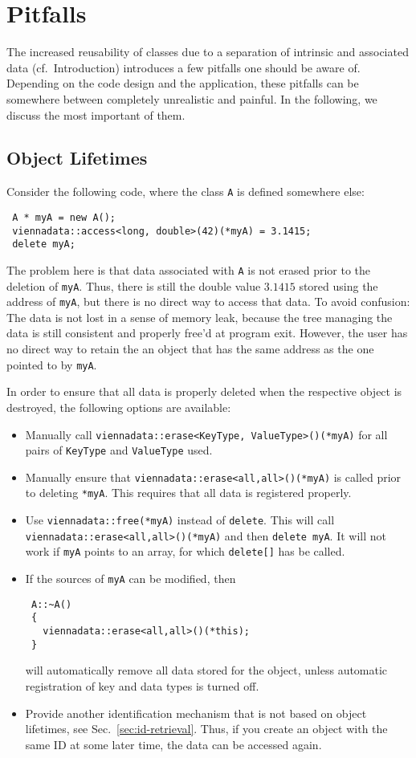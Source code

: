 \chapter{Pitfalls} \label{chap:pitfalls}
The increased reusability of classes due to a separation of intrinsic and associated data (cf.~Introduction)
introduces a few pitfalls one should be aware of. Depending on the code design and the application,
these pitfalls can be somewhere between completely unrealistic and painful. In the following, we discuss the most important of them.

\section{Object Lifetimes}
Consider the following code, where the class \lstinline|A| is defined somewhere else:
\begin{lstlisting}
 A * myA = new A();
 viennadata::access<long, double>(42)(*myA) = 3.1415;
 delete myA;
\end{lstlisting}
The problem here is that data associated with \lstinline|A| is not erased prior to the deletion of \lstinline|myA|.
Thus, there is still the double value $3.1415$ stored using the address of \lstinline|myA|, but there is no direct way to access that data.
To avoid confusion: The data is not lost in a sense of memory leak, because the tree managing the data is still consistent and properly free'd at program exit.
However, the user has no direct way to retain the an object that has the same address as the one pointed to by \lstinline|myA|.

In order to ensure that all data is properly deleted when the respective object is destroyed, the following options are available:
\begin{itemize}
 \item Manually call \lstinline|viennadata::erase<KeyType, ValueType>()(*myA)| for all pairs of \lstinline|KeyType| and \lstinline|ValueType| used.
 \item Manually ensure that \lstinline|viennadata::erase<all,all>()(*myA)| is called prior to deleting \lstinline|*myA|. This requires that all data is registered properly.
 \item Use \lstinline|viennadata::free(*myA)| instead of \lstinline|delete|. This will call \lstinline|viennadata::erase<all,all>()(*myA)| and then \lstinline|delete myA|. 
 It will not work if \lstinline|myA| points to an array, for which \lstinline|delete[]| has be called.
 \item If the sources of \lstinline|myA| can be modified, then
\begin{lstlisting}
 A::~A()
 {
   viennadata::erase<all,all>()(*this);
 }
\end{lstlisting}
will automatically remove all data stored for the object, unless automatic registration of key and data types is turned off.
 \item Provide another identification mechanism that is not based on object lifetimes, see Sec.~\ref{sec:id-retrieval}. Thus, if you create an object with the same ID at some later time, the data can be accessed again.
\end{itemize}


